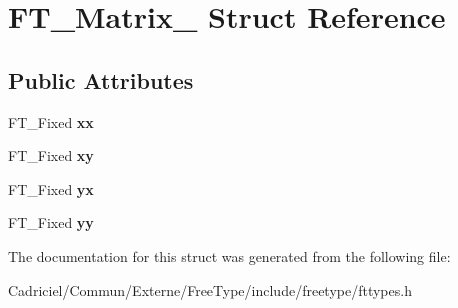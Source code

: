 \hypertarget{struct_f_t___matrix__}{}\section{F\+T\+\_\+\+Matrix\+\_\+ Struct Reference}
\label{struct_f_t___matrix__}
\subsection*{Public Attributes}
\begin{DoxyCompactItemize}
\item 
F\+T\+\_\+\+Fixed {\bfseries xx}\hypertarget{struct_f_t___matrix___a27d51c2958634abe7bf377610e095f74}{}\label{struct_f_t___matrix___a27d51c2958634abe7bf377610e095f74}

\item 
F\+T\+\_\+\+Fixed {\bfseries xy}\hypertarget{struct_f_t___matrix___a7e9f439d37c00ba1a11919bcaa8937a2}{}\label{struct_f_t___matrix___a7e9f439d37c00ba1a11919bcaa8937a2}

\item 
F\+T\+\_\+\+Fixed {\bfseries yx}\hypertarget{struct_f_t___matrix___a55792583a843a1611b43c40534a02a17}{}\label{struct_f_t___matrix___a55792583a843a1611b43c40534a02a17}

\item 
F\+T\+\_\+\+Fixed {\bfseries yy}\hypertarget{struct_f_t___matrix___a689a6fd20a88238788b90c3597ee0c2a}{}\label{struct_f_t___matrix___a689a6fd20a88238788b90c3597ee0c2a}

\end{DoxyCompactItemize}


The documentation for this struct was generated from the following file\+:\begin{DoxyCompactItemize}
\item 
Cadriciel/\+Commun/\+Externe/\+Free\+Type/include/freetype/fttypes.\+h\end{DoxyCompactItemize}
